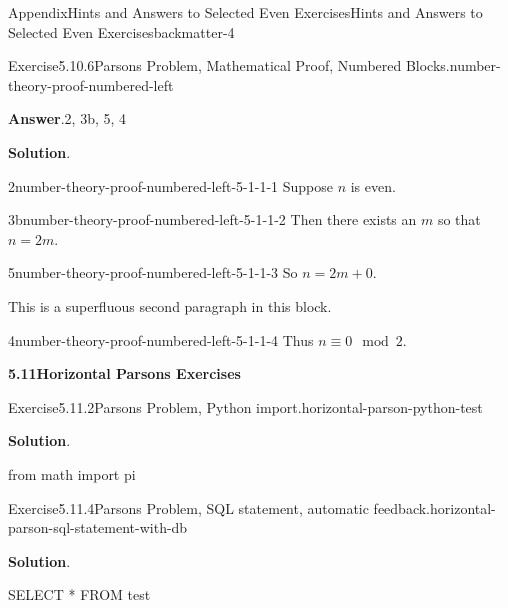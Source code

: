 \documentclass[oneside,10pt,]{book}
\newcommand{\blocktitlefont}{\relax}
\numberwithin{equation}{section}
\begin{document}
\begin{solutions-chapter}{Appendix}{Hints and Answers to Selected Even Exercises}{}{Hints and Answers to Selected Even Exercises}{}{}{backmatter-4}
\begin{divisionsolution}{Exercise}{5.10.6}{Parsons Problem, Mathematical Proof, Numbered Blocks.}{number-theory-proof-numbered-left}
\par\smallskip%
\noindent\textbf{\blocktitlefont Answer}.\hypertarget{number-theory-proof-numbered-left-4-back}{}\quad{}2, 3b, 5, 4%
\par\smallskip%
\noindent\textbf{\blocktitlefont Solution}.\hypertarget{number-theory-proof-numbered-left-5-back}{}\quad{}%
\begin{descriptionlist}
\begin{dlinarrow}{2}{number-theory-proof-numbered-left-5-1-1-1}%
Suppose \(n\) is even.%
\end{dlinarrow}%
\begin{dlinarrow}{3b}{number-theory-proof-numbered-left-5-1-1-2}%
Then there exists an \(m\) so that \(n = 2m\).%
\end{dlinarrow}%
\begin{dlinarrow}{5}{number-theory-proof-numbered-left-5-1-1-3}%
So \(n = 2m + 0\).%
\par
This is a superfluous second paragraph in this block.%
\end{dlinarrow}%
\begin{dlinarrow}{4}{number-theory-proof-numbered-left-5-1-1-4}%
Thus \(n\equiv 0\mod 2\).%
\end{dlinarrow}%
\end{descriptionlist}
%
\end{divisionsolution}%
\par\medskip
\noindent\textbf{\Large{}5.11\space\textperiodcentered\space{}Horizontal Parsons Exercises}
\begin{divisionsolution}{Exercise}{5.11.2}{Parsons Problem, Python import.}{horizontal-parson-python-test}%
\par\smallskip%
\noindent\textbf{\blocktitlefont Solution}.\hypertarget{horizontal-parson-python-test-3-back}{}\quad{}%
\begin{codedisplay}
from math import pi
\end{codedisplay}
%
\end{divisionsolution}%
\begin{divisionsolution}{Exercise}{5.11.4}{Parsons Problem, SQL statement, automatic feedback.}{horizontal-parson-sql-statement-with-db}%
\par\smallskip%
\noindent\textbf{\blocktitlefont Solution}.\hypertarget{horizontal-parson-sql-statement-with-db-3-back}{}\quad{}%
\begin{codedisplay}
SELECT * FROM test
\end{codedisplay}
%
\end{divisionsolution}%

\end{solutions-chapter}
\end{document}
